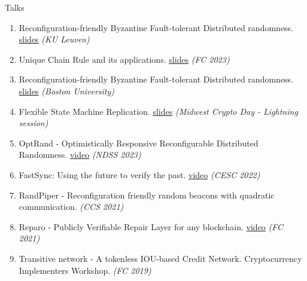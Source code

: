 \documentclass{resume}
\begin{document}
\begin{rSection}{Talks}
\label{sec:org744dfa4}
\begin{enumerate}
\item Reconfiguration-friendly Byzantine Fault-tolerant Distributed randomness. \href{https://adithyabhatkajake.github.io/assets/presentations/KU-Leuven-RandomBeacons.pptx}{slides}  \hfill  \emph{(KU Leuven)}
\item Unique Chain Rule and its applications. \href{https://adithyabhatkajake.github.io/assets/presentations/Unique-Chain-Rule-Applications.pptx}{slides}  \hfill  \emph{(FC 2023)}
\item Reconfiguration-friendly Byzantine Fault-tolerant Distributed randomness. \href{https://adithyabhatkajake.github.io/assets/presentations/BU-RandomBeacons.pptx}{slides}  \hfill  \emph{(Boston University)}
\item Flexible State Machine Replication. \href{https://adithyabhatkajake.github.io/assets/presentations/Midwest-crypto-day-Lightning-Talk.pptx}{slides}  \hfill  \emph{(Midwest Crypto Day - Lightning session)}
\item OptRand - Optimistically Responsive Reconfigurable Distributed Randomness. \href{https://www.youtube.com/watch?v=6DH2bGXP3-4}{video}  \hfill  \emph{(NDSS 2023)}
\item FastSync: Using the future to verify the past. \href{https://www.youtube.com/watch?v=kCqrd1MQ1no\&t=3341s}{video} \hfill  \emph{(CESC 2022)}
\item RandPiper - Reconfiguration friendly random beacons with quadratic communication. \hfill  \emph{(CCS 2021)}
\item Reparo - Publicly Verifiable Repair Layer for any blockchain. \href{https://youtube.com/watch?v=jV\_Pjc17eWY}{video}  \hfill  \emph{(FC 2021)}
\item Transitive network - A tokenless IOU-based Credit Network. Cryptocurrency Implementers Workshop.  \hfill  \emph{(FC 2019)}
\end{enumerate}
\end{rSection}
\end{document}
